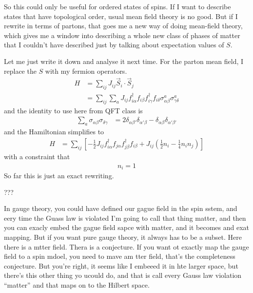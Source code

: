 So this could only be useful for ordered states of spins.
If I want to describe states that have topological order,
usual mean field theory is no good.
But if I rewrite in terms of partons,
that goes me a new way of doing mean-field theory,
which gives me a window into describing a whole new class of phases of matter
that I couldn't have described just by talking about expectation values of $S$.

Let me just write it down and analyse it next time.
For the parton mean field,
I replace the $S$ with my fermion operators.
\begin{align}
    H &=
    \sum_{ij}
    J_{ij}
    \vec{S}_i
    \cdot
    \vec{S}_j\\
    &=
    \sum_{ij}
    \sum_{a}
    J_{ij}
    f_{i\alpha}^\dagger
    f_{i\beta}
    f_{i\gamma}^\dagger
    f_{i\delta}
    \sigma_{\alpha\beta}^{a}
    \sigma_{\gamma\delta}^{a}
\end{align}
and the identity to use here from QFT class is
\begin{align}
    \sum_{a}
    \sigma_{\alpha\beta}
    \sigma_{\delta\gamma}
    &=
    2\delta_{\alpha\beta'}
    \delta_{\alpha'\beta}
    -
    \delta_{\alpha\beta}
    \delta_{\alpha'\beta'}
\end{align}
and the Hamiltonian simplifies to
\begin{align}
    H &=
    \sum_{ij}
    \left[ 
    -\frac{1}{2}
    J_{ij}
    f_{i\alpha}^\dagger
    f_{j\alpha}
    f_{j\beta}^\dagger
    f_{i\beta}
    +
    J_{ij}
    \left( 
    \frac{1}{2} n_i
    -
    \frac{1}{4} n_i n_j
    \right)
    \right]
\end{align}
with a constraint that
\begin{align}
    n_i = 1
\end{align}
So far this is just an exact rewriting.

\begin{question}
    ???
\end{question}
In gauge theory,
you could have defined our gague field in the spin sstem,
and eery time the Guass law is violated
I'm going to call that thing matter,
and then you can exacly embed the gague field sapce with matter,
and it becomes and exat mapping.
But if you want pure gauge theory,
it always has to be a subset.
Here there is a mtter field.
Thera is a conjecture.
If you want ot exactly map the gauge field to a spin mdoel,
you need to mave am tter field,
that's the completeness conjecture.
But you're right,
it seems like I embeeed it in hte larger space,
but there's this other thing yo ucould do,
and that is call every Gauss law violation ``matter''
and that maps on to the Hilbert space.

